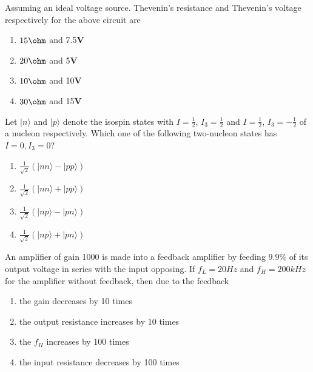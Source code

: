 Assuming an ideal voltage source. Thevenin's resistance and Thevenin's voltage respectively for the above circuit are 
\begin{multicols}{4}
\begin{enumerate}
    \item $15\ohm$ and 7.5\textbf{V}
    \item $20\ohm$ and 5\textbf{V}
    \item $10\ohm$ and 10\textbf{V}
    \item $30\ohm$ and 15\textbf{V}
\end{enumerate}
\end{multicols}
\item Let $ |n\rangle $ and $ |p\rangle $ denote the isospin states with $ I = \frac{1}{2} $, $ I_3 = \frac{1}{2} $ and $ I = \frac{1}{2} $, $ I_3 = -\frac{1}{2} $ of a nucleon respectively. Which one of the following two-nucleon states has $ I = 0, I_3 = 0 $?
\begin{multicols}{2}
\begin{enumerate}
    \item $ \frac{1}{\sqrt{2}} \left( | nn \rangle - | pp \rangle \right) $
    \item $ \frac{1}{\sqrt{2}} \left( | nn \rangle + | pp \rangle \right) $
    \item $ \frac{1}{\sqrt{2}} \left( | np \rangle - | pn \rangle \right) $
    \item $ \frac{1}{\sqrt{2}} \left( | np \rangle + | pn \rangle \right) $
\end{enumerate}
\end{multicols}
\item An amplifier of gain 1000 is made into a feedback amplifier by feeding $9.9\%$ of its output voltage in series with the input opposing. If $f_{L}=20Hz$ and $f_{H}=200kHz$ for the amplifier without feedback, then due to the feedback
\begin{enumerate}
    \item the gain decreases by 10 times
    \item the output resistance increases by 10 times
    \item the $f_{H}$ increases by 100 times
    \item the input resistance decreases by 100 times
\end{enumerate}
\item \hspace{1cm}

